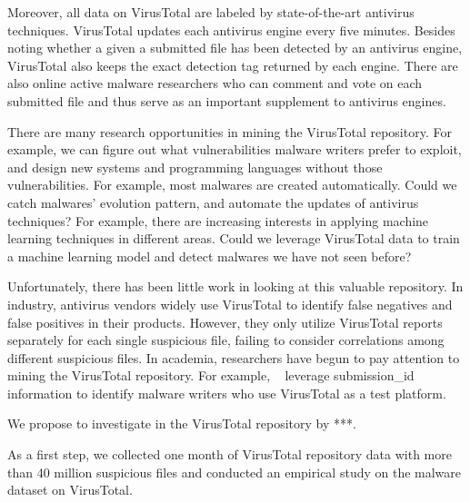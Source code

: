Moreover, all data on VirusTotal are labeled by state-of-the-art antivirus techniques. 
VirusTotal updates each antivirus engine every five minutes. 
Besides noting whether a given a submitted file has been detected by an antivirus engine, 
VirusTotal also keeps the exact detection tag returned by each engine. 
There are also online active malware researchers 
who can comment and vote on each submitted file 
and thus serve as an important supplement to antivirus engines. 

There are many research opportunities in mining the VirusTotal repository. 
For example, we can figure out what vulnerabilities malware writers prefer to exploit, 
and design new systems and programming languages without those vulnerabilities. 
For example, most malwares are created automatically. 
Could we catch malwares' evolution pattern, and automate the updates of antivirus techniques?
For example, there are increasing interests in applying machine learning techniques in different areas. 
Could we leverage VirusTotal data to train a machine learning model and detect malwares we have not seen before? 

Unfortunately, there has been little work in looking at this valuable repository.
In industry, antivirus vendors widely use VirusTotal to identify false negatives 
and false positives in their products. 
However, they only utilize VirusTotal reports separately for each single suspicious file, 
failing to consider correlations among different suspicious files. 
In academia, researchers have begun to pay attention to mining the VirusTotal repository. 
For example, ~\citet{neeles} leverage submission\_id information to identify malware writers 
who use VirusTotal as a test platform. 

We propose to investigate in the VirusTotal repository by ***.

As a first step, we collected one month of VirusTotal repository data with more than 40 million suspicious files
and conducted an empirical study on the malware dataset on VirusTotal. 


